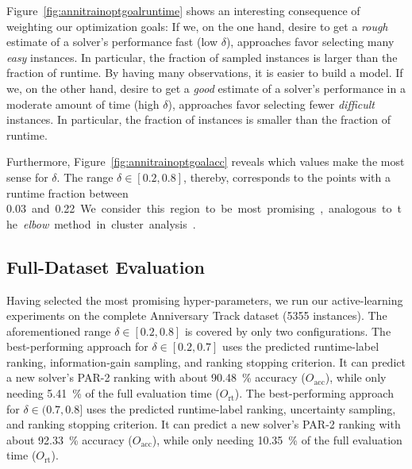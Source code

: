 \documentclass[runningheads]{llncs}
\begin{document}
Figure~\ref{fig:annitrainoptgoalruntime} shows an interesting consequence of weighting our optimization goals:
If we, on the one hand, desire to get a \emph{rough} estimate of a solver's performance fast (low $\delta$), approaches favor selecting many \emph{easy} instances.
In particular, the fraction of sampled instances is larger than the fraction of runtime.
By having many observations, it is easier to build a model.
If we, on the other hand, desire to get a \emph{good} estimate of a solver's performance in a moderate amount of time (high $\delta$), approaches favor selecting fewer \emph{difficult} instances.
In particular, the fraction of instances is smaller than the fraction of runtime.

Furthermore, Figure~\ref{fig:annitrainoptgoalacc} reveals which values make the most sense for $\delta$.
The range $\delta \in \left[0.2, 0.8\right]$, thereby, corresponds to the points with a runtime fraction between \SI{0.03} and \SI{0.22}.
We consider this region to be most promising, analogous to the \emph{elbow} method in cluster analysis~\cite{kodinariya2013review}.

\subsection{Full-Dataset Evaluation}

Having selected the most promising hyper-parameters, we run our active-learning experiments on the complete Anniversary Track dataset (5355 instances).
The aforementioned range $\delta \in \left[0.2, 0.8\right]$ is covered by only two configurations.
The best-performing approach for $\delta \in \left[0.2, 0.7\right]$ uses the predicted runtime-label ranking, information-gain sampling, and ranking stopping criterion.
It can predict a new solver's PAR-2 ranking with about \SI{90.48}{\%} accuracy ($O_{\operatorname{acc}}$), while only needing \SI{5.41}{\%} of the full evaluation time ($O_{\operatorname{rt}}$).
The best-performing approach for $\delta \in (0.7, 0.8]$ uses the predicted runtime-label ranking, uncertainty sampling, and ranking stopping criterion.
It can predict a new solver's PAR-2 ranking with about \SI{92.33}{\%} accuracy ($O_{\operatorname{acc}}$), while only needing \SI{10.35}{\%} of the full evaluation time ($O_{\operatorname{rt}}$).
\end{document}
